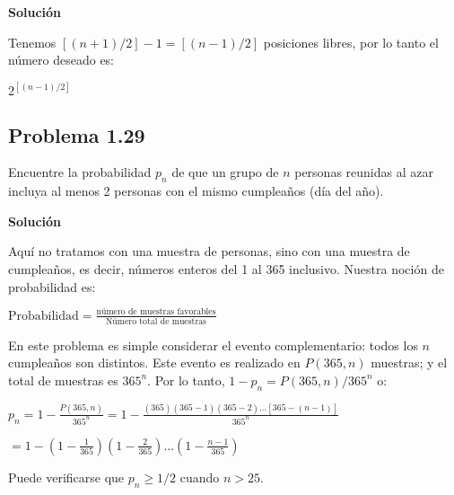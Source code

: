 \textbf{Solución}

Tenemos $[(n + 1)/2] - 1 = [(n - 1)/2]$ posiciones libres, por lo tanto el número
deseado es:

\begin{center}
$2^{[(n-1)/2]}$
\end{center}

\subsection*{Problema 1.29}
Encuentre la probabilidad $p_n$ de que un grupo de $n$ personas reunidas al azar
incluya al menos 2 personas con el mismo cumpleaños (día del año).

\textbf{Solución}

Aquí no tratamos con una muestra de personas, sino con una muestra de
cumpleaños, es decir, números enteros del 1 al 365 inclusivo. Nuestra noción de
probabilidad es:

\begin{center}
$\text{Probabilidad} = \frac{\text{número de muestras favorables}}{\text{Número
total de muestras}}$
\end{center}

En este problema es simple considerar el evento complementario: todos los $n$
cumpleaños son distintos. Este evento es realizado en $P(365,n)$ muestras; y el
total de muestras es $365^n$. Por lo tanto, $1-p_n = P(365,n)/365^n$ o:

\begin{center}
$p_n = 1 - \frac{P(365,n)}{365^n} = 1 -
\frac{(365)(365-1)(365-2)...[365-(n-1)]}{365^n} $
\end{center}

\begin{center}
$= 1-(1 - \frac{1}{365})(1 - \frac{2}{365})...(1 - \frac{n-1}{365})$
\end{center}

Puede verificarse que $p_n \geq 1/2 $ cuando $n>25$.

